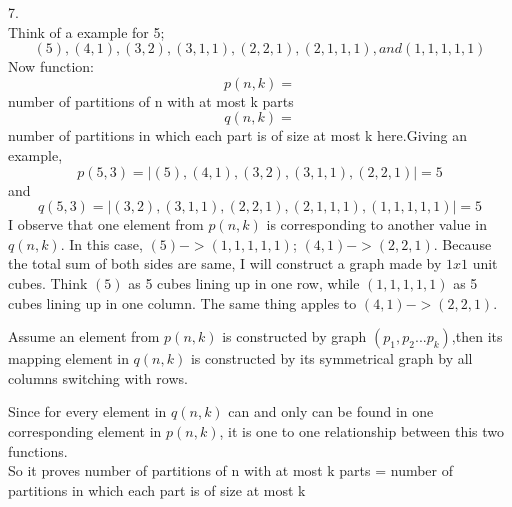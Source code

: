 \documentclass{article}
\begin{document}
7.\\Think of a example for 5;$$(5), (4, 1), (3, 2), (3, 1, 1), (2, 2, 1), (2, 1, 1, 1), and (1, 1, 1, 1, 1)$$
Now function: $$p(n,k) =$$ number of partitions of n with at most k parts
$$q(n,k) = $$ number of partitions in which each part is of size at most k 
here.Giving an example, $$p(5,3) = |{(5), (4, 1), (3, 2), (3, 1, 1), (2, 2, 1)}|= 5 $$
and $$q(5,3) = |{(3, 2), (3, 1, 1), (2, 2, 1), (2, 1, 1, 1),(1, 1, 1, 1, 1)}| = 5$$
I observe that one element from $p(n,k)$ is corresponding to another value in $q(n,k)$. In this case, $(5) -> (1,1,1,1,1)$;
$(4, 1) -> (2, 2, 1)$. Because the total sum of both sides are same, I will construct a graph made by $1x1$ unit cubes. Think $(5)$ as 5 cubes lining up in one row, while $(1,1,1,1,1)$ as 5 cubes lining up in one column. The same thing apples to $(4, 1) -> (2, 2, 1)$. 

Assume an element from $p(n,k)$ is constructed by graph $(p_1,p_2...p_k)$,then its mapping element in $q(n,k)$ is constructed by its symmetrical graph by all columns switching with rows.

Since for every element in $q(n,k)$ can and only can be found in one corresponding element in  $p(n,k)$, it is one to one relationship between this two functions.\\So it proves number of partitions of n with at most k parts = number of partitions in which each part is of size at most k 

 
\end{document}
